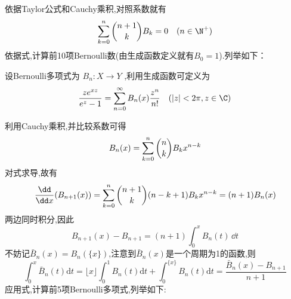 	依据Taylor公式和Cauchy乘积,对照系数就有
	\begin{equation}
		\sum_{k=0}^{n}\dbinom{n+1}{k}B_{k}=0\quad(n\in{\N^{+}})
	\end{equation}
	依据式,计算前10项Bernoulli数(由生成函数定义就有$B_{0}=1$).列举如下：
	


    设Bernoulli多项式为 $B_{n}:X\to Y$ ,利用生成函数可定义为
    \begin{equation}{}
        \frac{ze^{xz}}{e^{z}-1}=\sum_{n=0}^{\infty}B_{n}(x)\frac{z^{n}}{n!}\quad(|z|<2\pi,z\in{\C})
    \end{equation}	


	利用Cauchy乘积,并比较系数可得
	\begin{equation}
		B_{n}(x)=\sum_{k=0}^{n}\dbinom{n}{k}B_{k}x^{n-k}
	\end{equation}
	对式求导,故有
	\begin{equation}
		\frac{\dd}{\dd x}(B_{n+1}(x))=\sum_{k=0}^{n}\dbinom{n+1}{k}(n-k+1)B_{k}x^{n-k}=(n+1)B_{n}(x)
	\end{equation}
	两边同时积分,因此
	\begin{equation}
		B_{n+1}(x)-B_{n+1}=(n+1)\int_{0}^{x}B_{n}(t)\,\dd t
	\end{equation}
	不妨记$\bar{B}_{n}(x)=B_{n}(\{x\})$,注意到$\bar{B}_{n}(x)$是一个周期为1的函数,则
	\begin{equation}
		\int_{0}^{x}\bar{B}_{n}(t)\mathrm{d}t
        =\lfloor x\rfloor\int_{0}^{1}B_{n}(t)\mathrm{d}t+\int_{0}^{\{x\}}B_{n}(t)\mathrm{d}t
		=\frac{\bar{B}_{n}(x)-B_{n+1}}{n+1}
	\end{equation}
	应用式,计算前5项Bernoulli多项式,列举如下:
	



